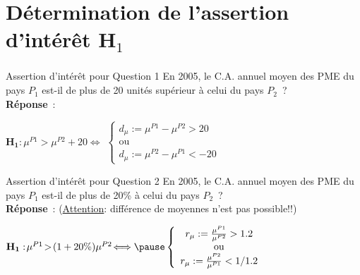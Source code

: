 \documentclass[11pt]{beamer}
\begin{document}
\section{Détermination de l'assertion d'intérêt $\mathbf{H}_1$}
\begin{frame}
\frametitle{}

\begin{block}{Assertion d'intérêt pour Question 1}
En 2005, le C.A. annuel moyen des PME du pays $P_1$ est-il de plus de 20 unités supérieur à celui du pays $P_2$~?\\
\pause
\textbf{Réponse}~:\\
\centerline{$
\mathbf{H_1}: \!\mu^{P1}>\mu^{P2}\!+\!20  \!\Longleftrightarrow\!$ \pause $\left\{\begin{array}{c} \!d_\mu:=\mu^{P1}\!-\!\mu^{P2} >20 \\
\mbox{ou}\\
 \!d_\mu:=\mu^{P2}\!-\!\mu^{P1} < -20
\end{array}\right.
$}
\end{block}
\pause
\begin{block}{Assertion d'intérêt pour Question 2}
En 2005, le C.A. annuel moyen des PME du pays $P_1$ est-il de plus de 20\% à celui du pays $P_2$~?\\
\pause
\textbf{Réponse}~: ({\small \underline{Attention}: différence de moyennes n'est pas possible!!})
\centerline{$
\mathbf{H_1}: \!\mu^{P1}\!>\!(1+20\%)\mu^{P2} \!\Longleftrightarrow \pause \left\{\begin{array}{c} r_\mu:=\frac{\mu^{P1}}{\mu^{P2}} >1.2\\\mbox{ou}\\r_\mu:=\frac{\mu^{P2}}{\mu^{P1}} < 1/1.2\end{array}\right.
$}
\end{block}
\end{frame}
\end{document}
